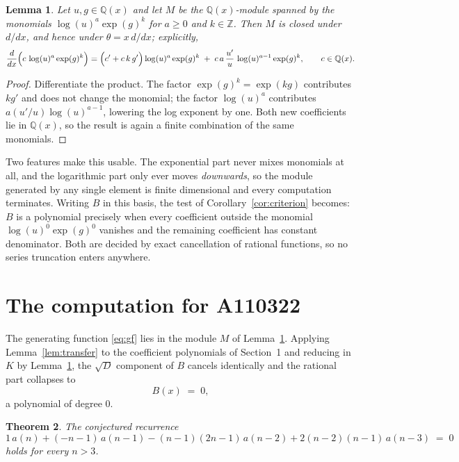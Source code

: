 \documentclass[11pt,a4paper]{article}
\theoremstyle{plain}
\newtheorem{theorem}{Theorem}
\newtheorem{lemma}[theorem]{Lemma}
\theoremstyle{definition}
\begin{document}
\begin{lemma}\label{lem:field}
Let $u,g\in\mathbb{Q}(x)$ and let $M$ be the $\mathbb{Q}(x)$-module spanned by the
monomials $\log(u)^{a}\exp(g)^{k}$ for $a\ge0$ and $k\in\mathbb{Z}$. Then $M$ is closed
under $d/dx$, and hence under $\theta=x\,d/dx$; explicitly,
\[
\frac{d}{dx}\Bigl(c\,\log(u)^{a}\exp(g)^{k}\Bigr)
=\Bigl(c'+c\,k\,g'\Bigr)\log(u)^{a}\exp(g)^{k}
\;+\;c\,a\,\frac{u'}{u}\,\log(u)^{a-1}\exp(g)^{k},
\qquad c\in\mathbb{Q}(x).
\]
\end{lemma}

\begin{proof}
Differentiate the product. The factor $\exp(g)^{k}=\exp(kg)$ contributes $kg'$ and does
not change the monomial; the factor $\log(u)^{a}$ contributes $a(u'/u)\log(u)^{a-1}$,
lowering the log exponent by one. Both new coefficients lie in $\mathbb{Q}(x)$, so the
result is again a finite combination of the same monomials.
\end{proof}

Two features make this usable. The exponential part never mixes monomials at all, and the
logarithmic part only ever moves \emph{downwards}, so the module generated by any single
element is finite dimensional and every computation terminates. Writing $B$ in this basis,
the test of Corollary~\ref{cor:criterion} becomes: $B$ is a polynomial precisely when every
coefficient outside the monomial $\log(u)^{0}\exp(g)^{0}$ vanishes and the remaining
coefficient has constant denominator. Both are decided by exact cancellation of rational
functions, so no series truncation enters anywhere.

\section{The computation for A110322}

The generating function \eqref{eq:gf} lies in the module $M$ of
Lemma~\ref{lem:field}.
Applying Lemma~\ref{lem:transfer} to the coefficient polynomials of Section~1 and reducing
in $K$ by Lemma~\ref{lem:field}, the $\sqrt{D}$ component of $B$ cancels identically and
the rational part collapses to
\[
B(x)\;=\;0 ,
\]
a polynomial of degree $0$.

\begin{theorem}
The conjectured recurrence
\[
1\,a(n) + (- n - 1)\,a(n-1) -  \left(n - 1\right) \left(2 n - 1\right)\,a(n-2) + 2 \left(n - 2\right) \left(n - 1\right)\,a(n-3) \;=\;0
\]
holds for every $n>3$.
\end{theorem}
\end{document}
